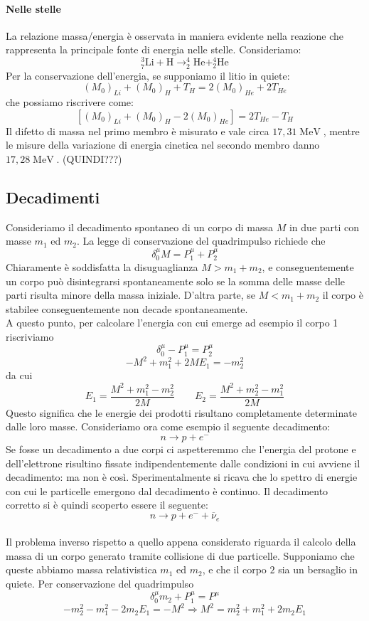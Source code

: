 \documentclass[a4paper,11pt]{book}
\theoremstyle{plain}
\theoremstyle{definition}
\DeclareMathOperator*{\mev}{MeV}
\begin{document}
\paragraph{Nelle stelle} La relazione massa/energia è osservata in maniera evidente nella reazione che rappresenta la principale fonte di energia nelle stelle. Consideriamo:
\[
_7^3\text{Li}+\text{H} \to _2^4\text{He} + _2^4\text{He}
\]
Per la conservazione dell'energia, se supponiamo il litio in quiete:
\[
(M_0)_{Li}+(M_0)_{H}+T_{H}=2(M_0)_{He}+2T_{He}
\]
che possiamo riscrivere come:
\[
[(M_0)_{Li}+(M_0)_{H}-2(M_0)_{He}]=2T_{He}-T_{H}
\]
Il difetto di massa nel primo membro è misurato e vale circa $17,31\mev$, mentre le misure della variazione di energia cinetica nel secondo membro danno $17,28\mev$. (QUINDI???)

\subsection{Decadimenti}
Consideriamo il decadimento spontaneo di un corpo di massa $M$ in due parti con masse $m_1$ ed $m_2$. La legge di conservazione del quadrimpulso richiede che
\[
\delta_0^{\mu}M=P^{\mu}_1+P^{\mu}_2
\]
Chiaramente è soddisfatta la disuguaglianza $M>m_1+m_2$, e conseguentemente un corpo può disintegrarsi spontaneamente solo se la somma delle masse delle parti risulta minore della massa iniziale. D'altra parte, se $M<m_1+m_2$ il corpo è stabilee conseguentemente non decade spontaneamente. \\
A questo punto, per calcolare l'energia con cui emerge ad esempio il corpo 1 riscriviamo
\[
\delta_0^{\mu}-P_1^{\mu}=P^{\mu}_2
\]
\[
-M^2+m_1^2+2ME_1=-m_2^2
\]
da cui
\[
E_1 = \frac{M^2+m_1^2-m_2^2}{2M} \qquad E_2 = \frac{M^2+m_2^2-m_1^2}{2M}
\]
Questo significa che le energie dei prodotti risultano completamente determinate dalle loro masse. Consideriamo ora come esempio il seguente decadimento:
\[
n\to p+e^-
\]
Se fosse un decadimento a due corpi ci aspetteremmo che l'energia del protone e dell'elettrone risultino fissate indipendentemente dalle condizioni in cui avviene il decadimento: ma non è così. Sperimentalmente si ricava che lo spettro di energie con cui le particelle emergono dal decadimento è continuo. Il decadimento corretto si è quindi scoperto essere il seguente:
\[
n\to p+e^- +\overline{\nu}_e
\]
\\
Il problema inverso rispetto a quello appena considerato riguarda il calcolo della massa di un corpo generato tramite collisione di due particelle. Supponiamo che queste abbiamo massa relativistica $m_1$ ed $m_2$, e che il corpo $2$ sia un bersaglio in quiete. Per conservazione del quadrimpulso
\[
\delta_0^{\mu}m_2+P^{\mu}_1 = P^{\mu}
\]
\[
-m_2^2-m_1^2-2m_2E_1=-M^2 \Rightarrow M^2 = m_2^2+m_1^2+2m_2E_1 
\]
\end{document}

